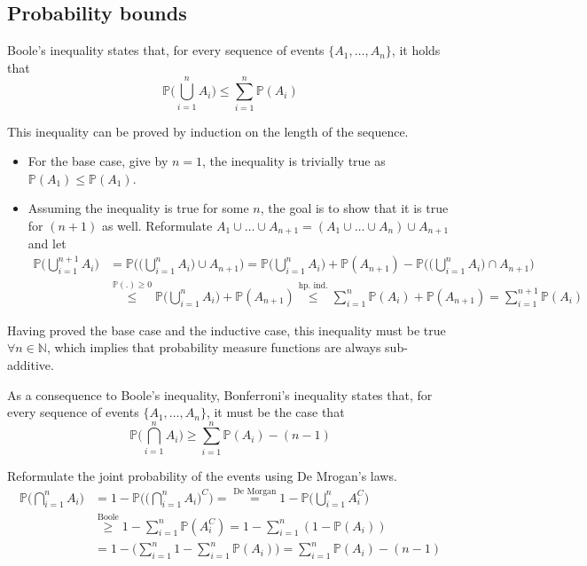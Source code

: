 \documentclass{report}
\begin{document}
\subsection{Probability bounds}
Boole's inequality states that, for every sequence of events $\displaystyle \{A_1, \dots, A_n\}$, it holds that
\[\mathbb{P}\Bigg(\bigcup_{i = 1}^n A_i\Bigg) \leq \sum_{i = 1}^n \mathbb{P}(A_i)\]
\begin{proofbox}
    This inequality can be proved by induction on the length of the sequence.
    \begin{itemize}
        \item For the base case, give by $\displaystyle n = 1$, the inequality is trivially true as $\displaystyle \mathbb{P}(A_1) \leq \mathbb{P}(A_1)$.
        \item Assuming the inequality is true for some $\displaystyle n$, the goal is to show that it is true for $\displaystyle (n + 1)$ as well. \newline
        Reformulate $\displaystyle A_1 \cup \dots \cup A_{n + 1} = (A_1 \cup \dots \cup A_n) \cup A_{n + 1}$ and let
        \begin{align*}
            \mathbb{P}\Bigg(\bigcup_{i = 1}^{n + 1} A_i\Bigg) 
              &= \mathbb{P}\Bigg(\Bigg(\bigcup_{i = 1}^n A_i\Bigg) \cup A_{n + 1}\Bigg) = \mathbb{P}\Bigg(\bigcup_{i = 1}^n A_i\Bigg) + \mathbb{P}(A_{n + 1}) - \mathbb{P}\Bigg(\Bigg(\bigcup_{i = 1}^n A_i\Bigg) \cap A_{n + 1}\Bigg) \\
              &\stackrel{\mathbb{P}(.) \ge 0}{\le} \mathbb{P}\Bigg(\bigcup_{i = 1}^n A_i\Bigg) + \mathbb{P}(A_{n + 1}) \stackrel{\text{hp. ind.}}{\le} \sum_{i=1}^{n} \mathbb{P}(A_i) + \mathbb{P}(A_{n+1}) = \sum_{i=1}^{n+1} \mathbb{P}(A_i)
        \end{align*}
    \end{itemize}
    Having proved the base case and the inductive case, this inequality must be true $\displaystyle \forall n \in \mathbb{N}$, which implies that probability measure functions are always sub-additive.
\end{proofbox}
\noindent As a consequence to Boole's inequality, Bonferroni's inequality states that, for every sequence of events $\displaystyle \{A_1, \dots, A_n\}$, it must be the case that
\[\mathbb{P}\Bigg(\bigcap_{i = 1}^n A_i\Bigg) \ge \sum_{i = 1}^n \mathbb{P}(A_i) - (n - 1)\]
\begin{proofbox}
    Reformulate the joint probability of the events using De Mrogan's laws.
    \begin{align*}
        \mathbb{P}\Bigg(\bigcap_{i = 1}^n A_i\Bigg)
            &= 1 - \mathbb{P}\Bigg(\Bigg(\bigcap_{i = 1}^n A_i\Bigg)^C\Bigg) = \stackrel{\text{De Morgan}}{=} 1 - \mathbb{P}\Bigg(\bigcup_{i = 1}^n A_i^C\Bigg) \\
            &\stackrel{\text{Boole}}{\ge} 1 - \sum_{i = 1}^n \mathbb{P}(A_i^C) = 1 - \sum_{i = 1}^n (1 - \mathbb{P}(A_i)) \\
            &= 1 - \Bigg(\sum_{i = 1}^n 1 - \sum_{i = 1}^n \mathbb{P}(A_i)\Bigg) = \sum_{i = 1}^n \mathbb{P}(A_i) - (n - 1)
    \end{align*}
\end{proofbox}
\end{document}
